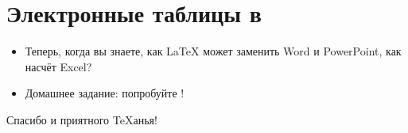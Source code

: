 \documentclass[usenames,dvipsnames]{beamer}
\begin{document}
\section{Электронные таблицы в \protect{}}

\begin{frame}[fragile]{\insertsection}
\begin{itemize}
\item Теперь, когда вы знаете, как \LaTeX{} может заменить Word и PowerPoint,
как насчёт Excel?
\item Домашнее задание: попробуйте
!
\end{itemize}
\end{frame}

\begin{frame}
\begin{center}
Спасибо и приятного \TeX{}анья!
\end{center}
\end{frame}
\end{document}

